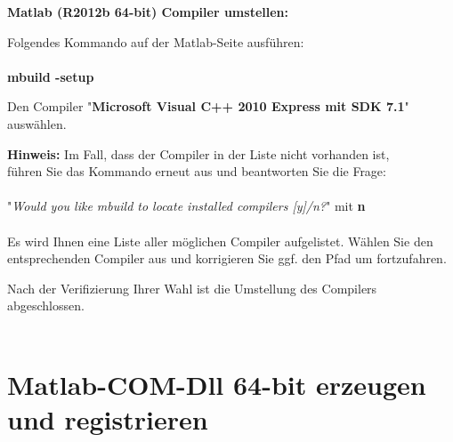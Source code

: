 \documentclass[a4paper,11pt]{article}
\begin{document}
\newpage
{}
\begin{mbuild}
	\item \textbf{Matlab (R2012b 64-bit) Compiler umstellen:}
	\begin{mbuild}
		\item Folgendes Kommando auf der Matlab-Seite ausführen: 
		\\ \\
		\hspace*{5mm} \textbf{mbuild -setup}
		\\
		\item Den Compiler "\textbf{Microsoft Visual C++ 2010 Express mit SDK 7.1}" auswählen.
		\\
		\begin{mbuild}
			\item \textbf{Hinweis:} Im Fall, dass der Compiler in der Liste nicht vorhanden ist,
			\\ führen Sie das Kommando erneut aus und beantworten Sie die Frage:
			\\
			\\ \hspace*{2mm} "\textit{Would you like mbuild to locate installed compilers [y]/n?}" mit \textbf{n}
			\\
			\\ Es wird Ihnen eine Liste aller möglichen Compiler aufgelistet. Wählen Sie den entsprechenden
			   Compiler aus und korrigieren Sie ggf. den Pfad um fortzufahren.
			\\
		\end{mbuild}
		
		\item Nach der Verifizierung Ihrer Wahl ist die Umstellung des Compilers abgeschlossen.
		\\ \\
	\end{mbuild}
\end{mbuild}

\section*{Matlab-COM-Dll 64-bit erzeugen und registrieren}
\end{document}

